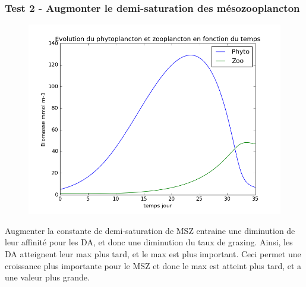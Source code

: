 {\subsubsection{Test 2 - Augmonter le demi-saturation des mésozooplancton}
\begin{figure}
  \includegraphics[width=\textwidth]{partie1/test2x35.png}
  \caption{\todo}
  \label{fig:partie1t2}
\end{figure}
\par{
Augmenter la constante de demi-saturation de MSZ entraine une diminution de leur affinité pour les DA,
et donc une diminution du taux de grazing. Ainsi, les DA atteignent leur max plus tard, et le max est plus
important. Ceci permet une croissance plus importante pour le MSZ et donc le max est atteint plus tard,
et a une valeur plus grande. 
}
\FloatBarrier

\clearpage
}

